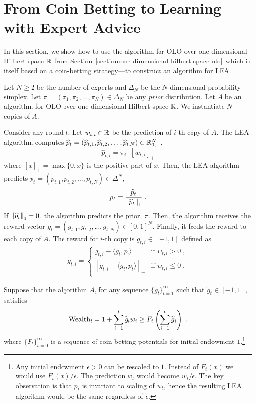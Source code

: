 \section{From Coin Betting to Learning with Expert Advice}
\label{section:reduction-experts}

In this section, we show how to use the algorithm for OLO over one-dimensional
Hilbert space $\mathbb{R}$ from
Section~\ref{section:one-dimensional-hilbert-space-olo}--which is itself based
on a coin-betting strategy---to construct an algorithm for \ac{LEA}.

Let $N \ge 2$ be the number of experts and $\Delta_N$ be the $N$-dimensional
probability simplex. Let $\pi = (\pi_1, \pi_2, \dots, \pi_N) \in \Delta_N$ be
any \emph{prior} distribution. Let $A$ be an algorithm for OLO over
one-dimensional Hilbert space $\mathbb{R}$. We instantiate $N$ copies of $A$.

Consider any round $t$. Let $w_{t,i} \in \mathbb{R}$ be the prediction of $i$-th copy of
$A$. The LEA algorithm computes $\widehat p_t = (\widehat p_{t,1}, \widehat
p_{t,2}, \dots, \widehat p_{t,N}) \in \mathbb{R}_{0,+}^N$,
\[
\widehat p_{t,i} = \pi_i \cdot [w_{t,i}]_+
\]
where $[x]_+ = \max\{0,x\}$ is the positive part of $x$. Then, the LEA
algorithm predicts $p_t = (p_{t,1}, p_{t,2}, \dots, p_{t,N}) \in \Delta^N$,
\[
p_t = \frac{\widehat p_t}{\left\|{\widehat p_t}\right\|_1} \; .
\]
If $\left\|{\widehat p_t}\right\|_1 = 0$, the algorithm predicts the prior, $\pi$.
Then, the algorithm receives the reward vector
$g_t = (g_{t,1}, g_{t,2}, \dots, g_{t,N}) \in [0,1]^N$. Finally, it
feeds the reward to each copy of $A$. The reward for $i$-th copy is $\widetilde g_{t,i} \in
[-1,1]$ defined as
\begin{align}
\label{eq:gradients_experts_reduction}
\widetilde g_{t,i} =
\begin{cases}
g_{t,i} - \langle g_t, p_t \rangle & \text{if } w_{t,i} > 0 \; , \\
\left[g_{t,i} - \langle g_t, p_t \rangle \right]_+ & \text{if } w_{t,i} \le 0 \; .
\end{cases}
\end{align}

Suppose that the algorithm $A$, for any sequence
$\{\widetilde g_t\}_{t=1}^\infty$ such that $\widetilde g_t \in [-1,1]$, satisfies
\begin{equation}
\label{equation:experts-one-dimensional-assumption}
\operatorname{Wealth}_t = 1 + \sum_{i=1}^t \widetilde g_i w_i \ge F_t\left(\sum_{i=1}^t \widetilde g_i\right) \; .
\end{equation}
where $\{F_t\}_{t=0}^\infty$ is a sequence of coin-betting potentials for
initial endowment $1$.\footnote{Any initial endowment $\epsilon > 0$ can be
rescaled to $1$. Instead of $F_t(x)$ we would use $F_t(x)/\epsilon$. The
prediction $w_t$ would become $w_t/\epsilon$. The key observation is that $p_t$
is invariant to scaling of $w_t$, hence the resulting LEA algorithm would be
the same regardless of $\epsilon$.}


